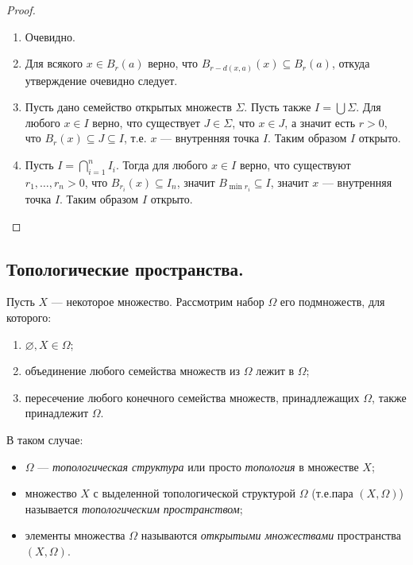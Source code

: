 \documentclass[12pt,a4paper]{article}
\begin{document}
    \begin{proof}\ 
        \begin{enumerate}
            \item Очевидно.
            \item Для всякого $x \in B_r(a)$ верно, что $B_{r-d(x, a)}(x) \subseteq B_r(a)$, откуда утверждение очевидно следует.
            \item Пусть дано семейство открытых множеств $\Sigma$. Пусть также $I = \bigcup \Sigma$. Для любого $x \in I$ верно, что существует $J \in \Sigma$, что $x \in J$, а значит есть $r > 0$, что $B_r(x) \subseteq J \subseteq I$, т.е. $x$ --- внутренняя точка $I$. Таким образом $I$ открыто.
            \item Пусть $I = \bigcap_{i = 1}^n I_i$. Тогда для любого $x \in I$ верно, что существуют $r_1, \dots, r_n > 0$, что $B_{r_i}(x) \subseteq I_n$, значит $B_{\min r_i} \subseteq I$, значит $x$ --- внутренняя точка $I$. Таким образом $I$ открыто.
        \end{enumerate}
    \end{proof}

    \subsection{Топологические пространства.}

    \begin{definition}
        Пусть $X$ --- некоторое множество. Рассмотрим набор $\Omega$ его подмножеств, для которого:
        \begin{enumerate}
            \item $\varnothing, X \in \Omega$;
            \item объединение любого семейства множеств из $\Omega$ лежит в $\Omega$;
            \item пересечение любого конечного семейства множеств, принадлежащих $\Omega$, также принадлежит $\Omega$.
        \end{enumerate}
        В таком случае:
        \begin{itemize}
            \item $\Omega$ --- \emph{топологическая структура} или просто \emph{топология} в множестве $X$;
            \item множество $X$ с выделенной топологической структурой $\Omega$ (т.е.пара $(X, \Omega)$) называется \emph{топологическим пространством};
            \item элементы множества $\Omega$ называются \emph{открытыми множествами} пространства $(X, \Omega)$.
        \end{itemize}
    \end{definition}
\end{document}

